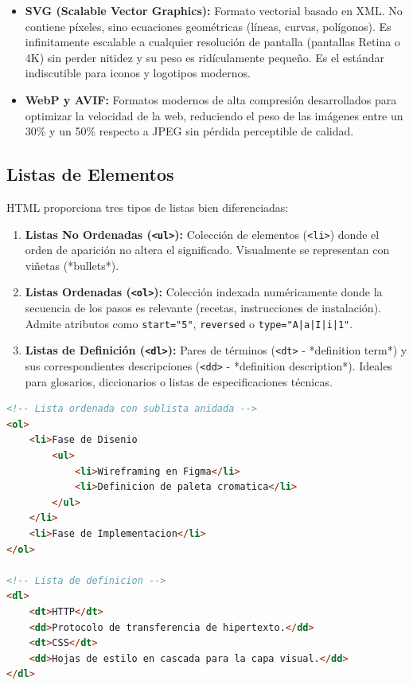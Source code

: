 \begin{itemize}[leftmargin=1.2cm]
\begin{itemize}
      \item \textbf{SVG (Scalable Vector Graphics):} Formato vectorial basado en XML. No contiene píxeles, sino ecuaciones geométricas (líneas, curvas, polígonos). Es infinitamente escalable a cualquier resolución de pantalla (pantallas Retina o 4K) sin perder nitidez y su peso es ridículamente pequeño. Es el estándar indiscutible para iconos y logotipos modernos.
      \item \textbf{WebP y AVIF:} Formatos modernos de alta compresión desarrollados para optimizar la velocidad de la web, reduciendo el peso de las imágenes entre un 30\% y un 50\% respecto a JPEG sin pérdida perceptible de calidad.
    \end{itemize}
\end{itemize}

\subsection{Listas de Elementos}

HTML proporciona tres tipos de listas bien diferenciadas:

\begin{enumerate}
  \item \textbf{Listas No Ordenadas (\texttt{<ul>}):} Colección de elementos (\texttt{<li>}) donde el orden de aparición no altera el significado. Visualmente se representan con viñetas (*bullets*).
  \item \textbf{Listas Ordenadas (\texttt{<ol>}):} Colección indexada numéricamente donde la secuencia de los pasos es relevante (recetas, instrucciones de instalación). Admite atributos como \texttt{start="5"}, \texttt{reversed} o \texttt{type="A|a|I|i|1"}.
  \item \textbf{Listas de Definición (\texttt{<dl>}):} Pares de términos (\texttt{<dt>} - *definition term*) y sus correspondientes descripciones (\texttt{<dd>} - *definition description*). Ideales para glosarios, diccionarios o listas de especificaciones técnicas.
\end{enumerate}

\begin{lstlisting}[language=HTML, caption={Listas anidadas y de definición en HTML5.}]
<!-- Lista ordenada con sublista anidada -->
<ol>
    <li>Fase de Disenio
        <ul>
            <li>Wireframing en Figma</li>
            <li>Definicion de paleta cromatica</li>
        </ul>
    </li>
    <li>Fase de Implementacion</li>
</ol>

<!-- Lista de definicion -->
<dl>
    <dt>HTTP</dt>
    <dd>Protocolo de transferencia de hipertexto.</dd>
    <dt>CSS</dt>
    <dd>Hojas de estilo en cascada para la capa visual.</dd>
</dl>
\end{lstlisting}

